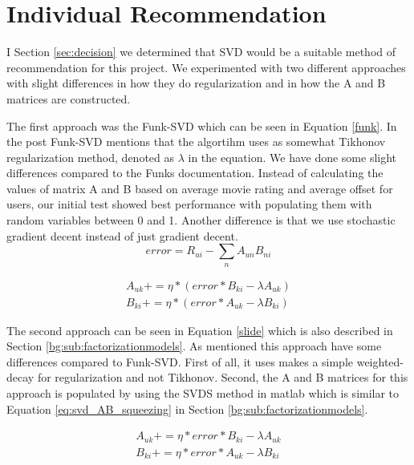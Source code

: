 \section{Individual Recommendation}\label{sec:individual_recommendation}
I Section \ref{sec:decision} we determined that SVD would be a suitable method of recommendation for this project. 
We experimented with two different approaches with slight differences in how they do regularization and in how the A and B matrices are constructed.

The first approach was the Funk-SVD which can be seen in Equation \ref{funk}\cite{svdsimonfunk}. In the post Funk-SVD mentions that the algortihm uses as somewhat Tikhonov regularization method, denoted as $\lambda$ in the equation. We have done some slight differences compared to the Funks documentation\cite{svdsimonfunk}. Instead of calculating the values of matrix A and B based on average movie rating and average offset for users, our initial test showed best performance with populating them with random variables between 0 and 1. Another difference is that we use stochastic gradient decent instead of just gradient decent. 
\begin{equation}
error = R_{ui} - \sum_n A_{un}B_{ni}
\end{equation}

\begin{equation}\label{funk}
\begin{aligned}
A_{uk} += \eta * (error * B_{ki} - \lambda A_{uk}) \\
B_{ki} += \eta * (error * A_{uk} - \lambda B_{ki})
\end{aligned}
\end{equation}

The second approach can be seen in Equation \ref{slide} which is also described in Section \ref{bg:sub:factorizationmodels}. As mentioned this approach have some differences compared to Funk-SVD. First of all, it uses makes a simple weighted-decay for regularization and not Tikhonov. Second, the A and B matrices for this approach is populated by using the SVDS method in matlab which is similar to Equation \ref{eq:svd_AB_squeezing} in Section \ref{bg:sub:factorizationmodels}.

\begin{equation}\label{slides}
\begin{aligned}
A_{uk} += \eta * error *B_{ki} - \lambda A_{uk} \\
B_{ki} += \eta * error *A_{uk} - \lambda B_{ki} 
\end{aligned}
\end{equation}

